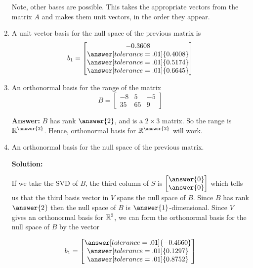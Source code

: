 \documentclass{ximera}
\begin{document}
\begin{example}
\begin{enumerate}
    Note, other bases are possible. This takes the appropriate vectors from the matrix $A$ and makes them unit vectors, in the order they appear.

    \item A unit vector basis for the null space of the previous matrix is \[
b_1 = \begin{bmatrix} -0.3608 \\ \answer[tolerance=.01]{0.4008} \\ \answer[tolerance=.01]{0.5174} \\ \answer[tolerance=.01]{0.6645} \end{bmatrix}
\]


    
    \item An orthonormal basis for the range of the matrix \[
B = \begin{bmatrix} 
-8 & 5 & -5 \\ 
35 & 65 & 9 
\end{bmatrix}
\]

    \textbf{Answer:} $B$ has rank $\answer{2}$, and is a $2\times 3$ matrix. So the range is $\RR^{\answer{2}}$. Hence,  orthonormal basis for $\RR^{\answer{2}}$ will work.

    \item An orthonormal basis for the null space of the previous matrix.
    
    \textbf{Solution:}

    If we take the SVD of $B$, the third column of $S$ is $\begin{bmatrix}
        \answer{0}\\\answer{0}
    \end{bmatrix}$ which tells us that the third basis vector in $V$ spans the null space of $B$. Since $B$ has rank $\answer{2}$ then the null space of $B$ is $\answer{1}$-dimensional. Since $V$ gives an orthonormal basis for $\mathbb{R}^3$, we can form the orthonormal basis for the null space of $B$ by the vector

    $$b_1=\begin{bmatrix}
        \answer[tolerance=.01]{-0.4660} \\
        \answer[tolerance=.01]{0.1297} \\
        \answer[tolerance=.01]{0.8752}
        \end{bmatrix}$$
    

\end{enumerate}
\end{example}
\end{document}
